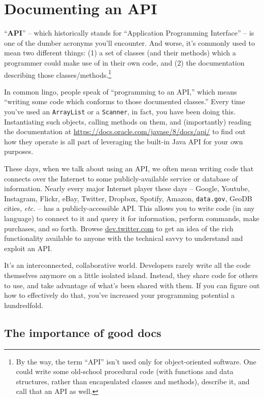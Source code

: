 
\chapter{Documenting an API}
\label{ch:api}

``\textbf{API}'' -- which historically stands for ``Application Programming
Interface'' -- is one of the dumber acronyms you'll encounter. And worse, it's
commonly used to mean two different things: (1) a set of classes (and their
methods) which a programmer could make use of in their own code, and (2) the
documentation describing those classes/methods.\footnote{By the way, the term
``API'' isn't used only for object-oriented software. One could write some
old-school procedural code (with functions and data structures, rather than
encapsulated classes and methods), describe it, and call that an API as well.}

In common lingo, people speak of ``programming to an API,'' which means
``writing some code which conforms to those documented classes.'' Every
time you've used an \texttt{ArrayList} or a \texttt{Scanner}, in fact, you
have been doing this. Instantiating such objects, calling methods on them, and
(importantly) reading the documentation at
\url{https://docs.oracle.com/javase/8/docs/api/} to find out how they
operate is all part of leveraging the built-in Java API for your own purposes.

These days, when we talk about using an API, we often mean writing code that
connects over the Internet to some publicly-available service or database of
information. Nearly every major Internet player these days -- Google, Youtube,
Instagram, Flickr, eBay, Twitter, Dropbox, Spotify, Amazon, \texttt{data.gov},
GeoDB cities, \textit{etc.} -- has a publicly-accessible API. This allows you
to write code (in any language) to connect to it and query it for information,
perform commands, make purchases, and so forth. Browse \url{dev.twitter.com} to
get an idea of the rich functionality available to anyone with the technical
savvy to understand and exploit an API.

It's an interconnected, collaborative world. Developers rarely write all the
code themselves anymore on a little isolated island. Instead, they share code
for others to use, and take advantage of what's been shared with them. If you
can figure out how to effectively do that, you've increased your programming
potential a hundredfold.

\section{The importance of good docs}

